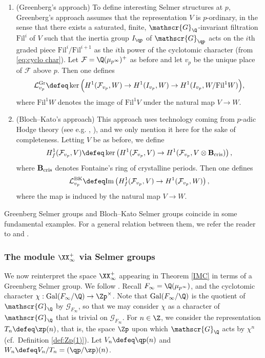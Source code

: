 \documentclass[a4paper,10pt, english, reqno]{smfart}
\newcommand{\cF}{\mathcal{F}}
\numberwithin{equation}{section}
\begin{document}
\begin{definition}\label{def:selmer at p}
\begin{enumerate}
\item (Greenberg's approach)  To define interesting Selmer structures at $p$, Greenberg's approach assumes that the representation $V$ is $p$-ordinary, in the sense that there exists a saturated, finite, $\mathscr{G}_{\Q}$-invariant filtration $\mathrm{Fil}^i$ of $V$ such that the inertia group $I_{\qp}$ of $\mathscr{G}_{\qp}$ acts on the $i$th graded piece $\mathrm{Fil}^i/\mathrm{Fil}^{i+1}$ as the $i$th power of the cyclotomic character (from \eqref{eq:cyclo char}). Let $\cF = \Q(\mu_{p^\infty})^+$ as before and let $v_p$ be the unique place of $\cF$ above $p$. Then one defines
\[ \mathcal{L}^{\mathrm{Gr}}_{v_p} \defeq \ker \Big( H^1(\mathcal{F}_{v_p}, W) \to H^1(I_{v_p}, W) \to H^1(I_{v_p}, W / \mathrm{Fil}^1 W) \Big), \]
where $\mathrm{Fil}^1 W$ denotes the image of $\mathrm{Fil}^1 V$ under the natural map $V \to W$.
\item (Bloch--Kato's approach) This approach uses technology coming from $p$-adic Hodge theory (see e.g. \cite{Ber02}, \cite{Ben22}), and we only mention it here for the sake of completeness. Letting $V$ be as before, we define
\[ H^1_f(\cF_{v_p}, V) \defeq \ker \left( H^1(\cF_{v_p}, V) \to H^1(\cF_{v_p}, V \otimes \mathbf{B}_{\rm cris}) \right), \]
where $\mathbf{B}_{\rm cris}$ denotes Fontaine's ring of crystalline periods. Then one defines
\[ \mathcal{L}^{\mathrm{BK}}_{v_p} \defeq \mathrm{Im} \left( H^1_f(\cF_{v_p}, V) \to H^1(\cF_{v_p}, W) \right), \]
where the map is induced by the natural map $V \to W$.
\end{enumerate}
\end{definition}

\begin{remark}
Greenberg Selmer groups and Bloch--Kato Selmer groups coincide in some fundamental examples. For a general relation between them, we refer the reader to \cite{kato98} and \cite[\S 2.4.7]{PerrinRiou}.
\end{remark}


\subsubsection{The module $\XX_\infty^+$ via Selmer groups}
 
We now reinterpret the space $\XX_\infty^+$ appearing in Theorem \ref{IMC} in terms of a Greenberg Selmer group. We follow \cite[\S1]{Gre89}. Recall $F_\infty = \Q(\mu_{p^\infty})$, and the cyclotomic character $\chi : \mathrm{Gal}(F_\infty/\Q) \to \Zp^\times$. Note that $\mathrm{Gal}(F_\infty/\Q)$ is the quotient of $\mathscr{G}_{\Q}$ by $\mathscr{G}_{F_\infty}$, so that we may consider $\chi$ as a character of $\mathscr{G}_{\Q}$ that is trivial on $\mathscr{G}_{F_\infty}$. For $n \in \Z$, we consider the representation $T_n \defeq \zp(n)$, that is, the space $\Zp$ upon which $\mathscr{G}_{\Q}$ acts by $\chi^n$ (cf.\ Definition \ref{def:Zp(1)}). Let $V_n \defeq \qp(n)$ and $W_n \defeq V_n/T_n =  (\qp / \zp)(n)$. 
\end{document}
